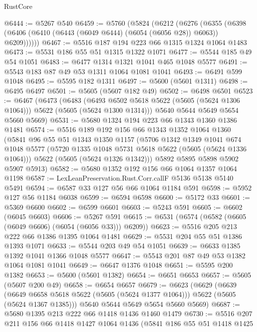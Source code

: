 \begin{lexlean}{RustCore}
\begin{coremodule}
@6444 := @5267 @540
@6459 := @5760
    (@5824
      (@6212
        (@6276
          (@6355 (@6398 (@6406 (@6410 (@6443 (@6049 @6444) (@6054 (@6056 @28)) @6063)) @6209))))))
@6467 := @5516 @187 @194 @223 @66 @1315 @1324 @1064 @1483
@6473 := @5531 @186 @55 @51 @1315 @1322 @1071
@6477 := @5544 @185 @49 @54 @1051
@6483 := @6477 @1314 @1321 @1041 @465 @1048 @5577
@6491 := @5543 @183 @87 @49 @53 @1311 @1064 @1081 @1041
@6493 := @6491 @599 @1048
@6495 := @5595 @182 @1311
@6497 := @5600 (@5601 @1311)
@6498 := @6495 @6497
@6501 := @5605 (@5607 @182 @49)
@6502 := @6498 @6501
@6523 := @6467
    (@6473
      (@6483
        (@6493 @6502 @5618 @5622 (@5605 (@5624 @1306 @1064)))
        @5622
        (@5605 (@5624 @1300 @1314)))
      @5640
      @5644
      @5649
      @5654
      @5660
      @5669)
@6531 := @5680 @1324 @194 @223 @66 @1343 @1360 @1386 @1481
@6574 := @5516
    @189
    @192
    @156
    @66
    @1343
    @1352
    @1064
    @1360
    (@5841
      @96
      @55
      @51
      @1343
      @1350
      @1157
      (@5706
        @1342
        @1349
        @1041
        @674
        @1048
        @5577
        (@5720 @1335 @1048 @5731 @5618 @5622 (@5605 (@5624 @1336 @1064)))
        @5622
        (@5605 (@5624 @1326 @1342)))
      @5892
      @5895
      @5898
      @5902
      @5907
      @5913)
@6582 := @5680 @1352 @192 @156 @66 @1064 @1357 @1064 @1198
@6587 := LexLeanPreservation.Rust.Corr.callF @5136 @5138 @5140 @5491
@6594 := @6587 @33 @127 @56 @66 @1064 @1184 @591
@6598 := @5952 @127 @56 @1184 @6038
@6599 := @6594 @6598
@6600 := @5172 @33
@6601 := @5369 @6600
@6602 := @6599 @6601
@6603 := @5243 @591
@6605 := @6602 (@6045 @6603)
@6606 := @5267 @591
@6615 := @6531 (@6574 (@6582 (@6605 (@6049 @6606) (@6054 (@6056 @33))) @6209))
@6623 := @5516 @205 @213 @222 @66 @1386 @1395 @1064 @1481
@6629 := @5531 @204 @55 @51 @1386 @1393 @1071
@6633 := @5544 @203 @49 @54 @1051
@6639 := @6633 @1385 @1392 @1041 @1366 @1048 @5577
@6647 := @5543 @201 @87 @49 @53 @1382 @1064 @1081 @1041
@6649 := @6647 @1376 @1048
@6651 := @5595 @200 @1382
@6653 := @5600 (@5601 @1382)
@6654 := @6651 @6653
@6657 := @5605 (@5607 @200 @49)
@6658 := @6654 @6657
@6679 := @6623
    (@6629
      (@6639
        (@6649 @6658 @5618 @5622 (@5605 (@5624 @1377 @1064)))
        @5622
        (@5605 (@5624 @1367 @1385)))
      @5640
      @5644
      @5649
      @5654
      @5660
      @5669)
@6687 := @5680 @1395 @213 @222 @66 @1418 @1436 @1460 @1479
@6730 := @5516
    @207
    @211
    @156
    @66
    @1418
    @1427
    @1064
    @1436
    (@5841
      @186
      @55
      @51
      @1418
      @1425

\end{coremodule}
\end{lexlean}
